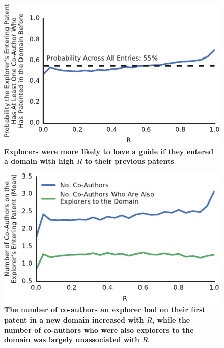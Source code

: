\documentclass{dsj}
\begin{document}
\begin{figure}%
\includegraphics[width=\columnwidth]{figs/p(Guide)_by_R.pdf} 
\caption{\textbf{Explorers were more likely to have a guide if they entered a domain with high $R$ to their previous patents}. }\label{p(Guide)_by_R}
\end{figure}

\begin{figure}%
\includegraphics[width=\columnwidth]{figs/N_co-authors_by_R.pdf} 
\caption{\textbf{The number of co-authors an explorer had on their first patent in a new domain increased with $R$, while the number of co-authors who were also explorers to the domain was largely unassociated with $R$}. }\label{N_co-authors_by_R}
\end{figure}
\end{document}
